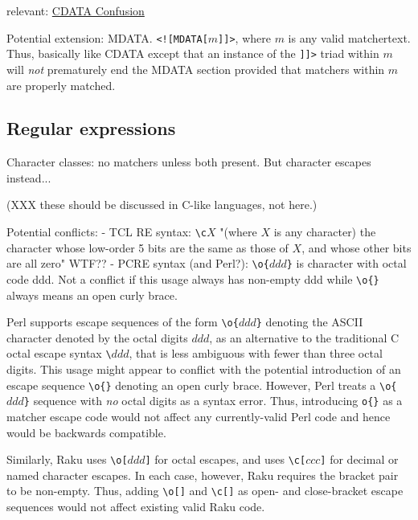 relevant:
\href{http://www.flightlab.com/~joe/sgml/cdata.html}{CDATA Confusion}


Potential extension: MDATA.
\verb|<![MDATA[|$m$\verb|]]>|,
where $m$ is any valid matchertext.
Thus, basically like CDATA except that
an instance of the \verb|]]>| triad within $m$
will \emph{not} prematurely end the MDATA section
provided that matchers within $m$ are properly matched.


\subsection{Regular expressions}

Character classes: no matchers unless both present.
But character escapes instead...

(XXX these should be discussed in C-like languages, not here.)

Potential conflicts:
- TCL RE syntax: \verb|\c|$X$ "(where $X$ is any character) the character whose low-order 5 bits are the same as those of $X$, and whose other bits are all zero"
WTF??
- PCRE syntax (and Perl?): \verb|\o{|$ddd$\verb|}| is character with octal code ddd.  Not a conflict if this usage always has non-empty ddd while \verb|\o{}| always means an open curly brace.

Perl supports escape sequences of the form \verb|\o{|$ddd$\verb|}|
denoting the ASCII character denoted by the octal digits $ddd$,
as an alternative to the traditional C octal escape syntax \verb|\|$ddd$,
that is less ambiguous with fewer than three octal digits.
This usage might appear to conflict with the potential introduction
of an escape sequence \verb|\o{}| denoting an open curly brace.
However, Perl treats a \verb|\o{|$ddd$\verb|}| sequence
with \emph{no} octal digits as a syntax error.
Thus, introducing \verb|o{}| as a matcher escape code
would not affect any currently-valid Perl code
and hence would be backwards compatible.

Similarly, Raku uses \verb|\o[|$ddd$\verb|]| for octal escapes,
and uses \verb|\c[|$ccc$\verb|]|
for decimal or named character escapes.
In each case, however, Raku requires the bracket pair to be non-empty.
Thus, adding \verb|\o[]| and \verb|\c[]|
as open- and close-bracket escape sequences
would not affect existing valid Raku code.

